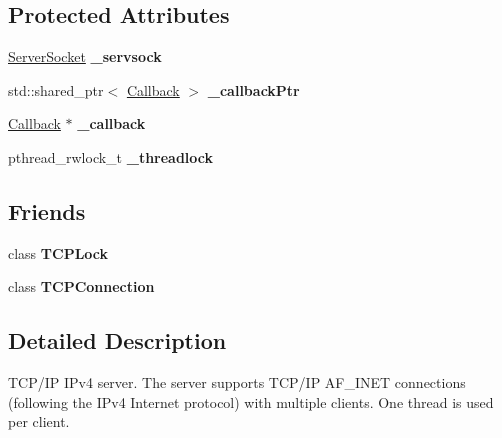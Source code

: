 \subsection*{Protected Attributes}
\begin{DoxyCompactItemize}
\item 
\hypertarget{classcppu_1_1_t_c_p_server_a8e4422abf23dc5bd195d05a3e9eee167}{\hyperlink{classcppu_1_1_server_socket}{Server\+Socket} {\bfseries \+\_\+servsock}}\label{classcppu_1_1_t_c_p_server_a8e4422abf23dc5bd195d05a3e9eee167}

\item 
\hypertarget{classcppu_1_1_t_c_p_server_abe36d427d7b047cdd342e282611c841e}{std\+::shared\+\_\+ptr$<$ \hyperlink{structcppu_1_1_t_c_p_server_1_1_callback}{Callback} $>$ {\bfseries \+\_\+callback\+Ptr}}\label{classcppu_1_1_t_c_p_server_abe36d427d7b047cdd342e282611c841e}

\item 
\hypertarget{classcppu_1_1_t_c_p_server_a68940bd70ac6941ca49d1e51b631f5e9}{\hyperlink{structcppu_1_1_t_c_p_server_1_1_callback}{Callback} $\ast$ {\bfseries \+\_\+callback}}\label{classcppu_1_1_t_c_p_server_a68940bd70ac6941ca49d1e51b631f5e9}

\item 
\hypertarget{classcppu_1_1_t_c_p_server_aea2dbb4b5762044217096e52cd559b97}{pthread\+\_\+rwlock\+\_\+t {\bfseries \+\_\+threadlock}}\label{classcppu_1_1_t_c_p_server_aea2dbb4b5762044217096e52cd559b97}

\end{DoxyCompactItemize}
\subsection*{Friends}
\begin{DoxyCompactItemize}
\item 
\hypertarget{classcppu_1_1_t_c_p_server_a94abdeb80587f39a869fde6f24522a78}{class {\bfseries T\+C\+P\+Lock}}\label{classcppu_1_1_t_c_p_server_a94abdeb80587f39a869fde6f24522a78}

\item 
\hypertarget{classcppu_1_1_t_c_p_server_a9d1c27bdfcdd48c5f07a5d0dce43b346}{class {\bfseries T\+C\+P\+Connection}}\label{classcppu_1_1_t_c_p_server_a9d1c27bdfcdd48c5f07a5d0dce43b346}

\end{DoxyCompactItemize}


\subsection{Detailed Description}
T\+C\+P/\+I\+P I\+Pv4 server. The server supports T\+C\+P/\+I\+P A\+F\+\_\+\+I\+N\+E\+T connections (following the I\+Pv4 Internet protocol) with multiple clients. One thread is used per client. 

